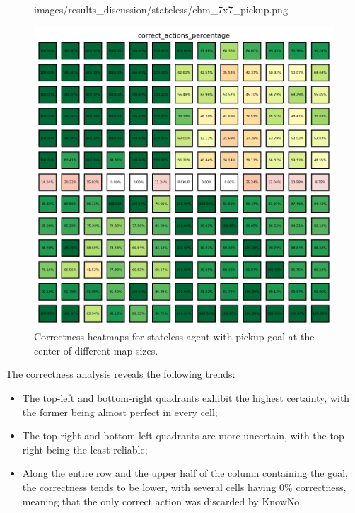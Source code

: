 \begin{figure}[ht]
\begin{minipage}[b]{0.32\textwidth}
{      images/results_discussion/stateless/chm_7x7_pickup.png
    }
    \caption{$7 \times 7$}
    \label{fig:chm_7x7_pickup}
  \end{minipage}
  \hfill
  \begin{minipage}[b]{0.32\textwidth}
    \centering
    \includegraphics[width=\textwidth]{
      images/results_discussion/stateless/chm_13x13_pickup.png
    }
    \caption{$13 \times 13$}
    \label{fig:chm_13x13_pickup}
  \end{minipage}
  \caption{Correctness heatmaps for stateless agent with pickup goal at the
  center of different map sizes.}
  \label{fig:stateless_pickup_correctness}
\end{figure}
\vspace{5mm}

The correctness analysis reveals the following trends:
\begin{itemize}
  \item The top-left and bottom-right quadrants exhibit the highest certainty,
    with the former being almost perfect in every cell;

  \item The top-right and bottom-left quadrants are more uncertain, with the top-right
    being the least reliable;

  \item Along the entire row and the upper half of the column containing the goal,
    the correctness tends to be lower, with several cells having 0\% correctness,
    meaning that the only correct action was discarded by KnowNo.
\end{itemize}

